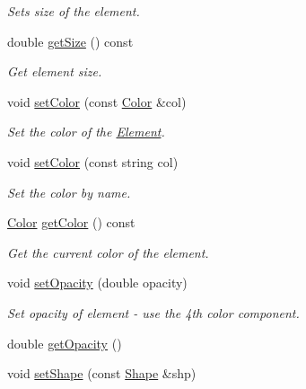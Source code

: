 \begin{DoxyCompactItemize}
\begin{DoxyCompactList}\small\item\em Sets size of the element. \end{DoxyCompactList}\item 
double \hyperlink{classbridges_1_1datastructure_1_1_element_a8c0b15450978b03c8ebf6a3c23092cba}{get\+Size} () const
\begin{DoxyCompactList}\small\item\em Get element size. \end{DoxyCompactList}\item 
void \hyperlink{classbridges_1_1datastructure_1_1_element_a17d75aae50a48b3404f3c6811c62ae1c}{set\+Color} (const \hyperlink{classbridges_1_1datastructure_1_1_color}{Color} \&col)
\begin{DoxyCompactList}\small\item\em Set the color of the \hyperlink{classbridges_1_1datastructure_1_1_element}{Element}. \end{DoxyCompactList}\item 
void \hyperlink{classbridges_1_1datastructure_1_1_element_a3792c8d514f4d644d739c6124f26bcbf}{set\+Color} (const string col)
\begin{DoxyCompactList}\small\item\em Set the color by name. \end{DoxyCompactList}\item 
\hyperlink{classbridges_1_1datastructure_1_1_color}{Color} \hyperlink{classbridges_1_1datastructure_1_1_element_adf441bce0ef9e4abd36c1df00ea5932c}{get\+Color} () const
\begin{DoxyCompactList}\small\item\em Get the current color of the element. \end{DoxyCompactList}\item 
void \hyperlink{classbridges_1_1datastructure_1_1_element_acb5d0b5734a6b3c17b7b1784ae1dc79c}{set\+Opacity} (double opacity)
\begin{DoxyCompactList}\small\item\em Set opacity of element -\/ use the 4th color component. \end{DoxyCompactList}\item 
double \hyperlink{classbridges_1_1datastructure_1_1_element_acf14bfc12da42565b237a7bd79bd36c2}{get\+Opacity} ()
\item 
void \hyperlink{classbridges_1_1datastructure_1_1_element_a1ef398bf1027244a624575e58a569ed9}{set\+Shape} (const \hyperlink{namespacebridges_1_1datastructure_a3408f5f44d9c6062e5f3adb7e1bbb7f0}{Shape} \&shp)

\end{DoxyCompactItemize}
